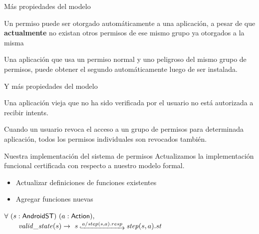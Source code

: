 \documentclass[pdf, handout]{beamer} %
\begin{document}
\begin{frame}{Más propiedades del modelo}
    \begin{prop}
        Un permiso puede ser otorgado automáticamente a una aplicación, a pesar de que
        \textbf{actualmente} no existan otros permisos de ese mismo grupo ya otorgados a la misma
    \end{prop}
    \pause \vspace{20px}
    \begin{prop}
        Una aplicación que usa un permiso normal y uno peligroso del mismo grupo de permisos, puede
        obtener el segundo automáticamente luego de ser instalada.
    \end{prop}
\end{frame}

\begin{frame}{Y más propiedades del modelo}
    \begin{prop}
        Una aplicación vieja que no ha sido verificada por el usuario no está autorizada a recibir
        intents.
    \end{prop}
    \pause \vspace{20px}
    \begin{prop}
        Cuando un usuario revoca el acceso a un grupo de permisos para determinada aplicación, todos
        los permisos individuales son revocados también.
    \end{prop}
\end{frame}

\begin{frame}{Nuestra implementación del sistema de permisos}
    Actualizamos la implementación funcional certificada con respecto a nuestro modelo formal.
    \begin{itemize}
        \item Actualizar definiciones de funciones existentes
        \item Agregar funciones nuevas
    \end{itemize}
    \pause \vspace{20px}
    \begin{theorem}
        $ \forall\ (s:\AndroidState)\ (a:\Action),$ \\
        $\quad \quad \ap{valid\_state}{s} \rightarrow\ s\step{a/step(s,a).resp} \bap{step}{s}{a}.st$
    \end{theorem}
\end{frame}
\end{document}
